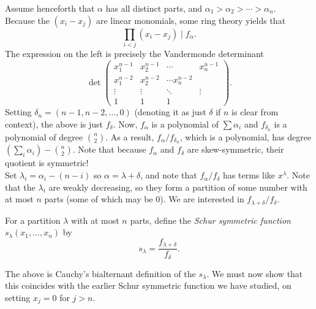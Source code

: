 	Assume henceforth that $\alpha$ has all distinct parts, and $\alpha_1 > \alpha_2 > \cdots > \alpha_n$.\\
	Because the $(x_i - x_j)$ are linear monomials, some ring theory yields that
	\[ \prod_{i < j} (x_i - x_j) \mid f_\alpha. \]
	The expression on the left is precisely the Vandermonde determinant
	\[ \det \begin{pmatrix} x_1^{n-1} & x_2^{n-1} & \cdots & x_n^{n-1} \\ x_1^{n-2} & x_2^{n-2} & \cdots x_n^{n-2} \\ \vdots & \vdots & \ddots & \vdots \\ 1 & 1 & 1 \end{pmatrix}. \]
	Setting $\delta_n = (n-1,n-2,\ldots,0)$ (denoting it as just $\delta$ if $n$ is clear from context), the above is just $f_{\delta}$. Now, $f_\alpha$ is a polynomial of $\sum \alpha_i$ and $f_{\delta_n}$ is a polynomial of degree $\binom{n}{2}$. As a result, $f_\alpha/f_{\delta_n}$, which is a polynomial, has degree $\left(\sum_i \alpha_i\right) - \binom{n}{2}$. Note that because $f_\alpha$ and $f_\delta$ are skew-symmetric, their quotient is symmetric!\\
	Set $\lambda_i = \alpha_i - (n-i)$ so $\alpha = \lambda + \delta$, and note that $f_\alpha/f_\delta$ has terms like $x^\lambda$. Note that the $\lambda_i$ are weakly decreasing, so they form a partition of some number with at most $n$ parts (some of which may be $0$). We are interested in $f_{\lambda+\delta}/f_\delta$.

	\begin{fdef}
		For a partition $\lambda$ with at most $n$ parts, define the \emph{Schur symmetric function} $s_\lambda(x_1,\ldots,x_n)$ by
		\[ s_\lambda = \frac{f_{\lambda+\delta}}{f_\delta}. \]
	\end{fdef}
	The above is Cauchy's bialternant definition of the $s_\lambda$. We must now show that this coincides with the earlier Schur symmetric function we have studied, on setting $x_j = 0$ for $j > n$.

